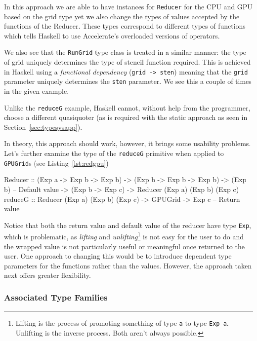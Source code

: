 \documentclass[12pt,a4paper,twoside]{scrbook}
\begin{document}
In this approach we are able to have instances for \texttt{Reducer} for the CPU
and GPU based on the grid type yet we also change the types of values accepted
by the functions of the Reducer. These types correspond to different types of
functions which tells Haskell to use Accelerate's overloaded versions of
operators.

We also see that the \texttt{RunGrid} type class is treated in a similar manner:
the type of grid uniquely determines the type of stencil function required. This
is achieved in Haskell using a \emph{functional dependency} (\texttt{grid ->
  sten}) meaning that the \texttt{grid} parameter uniquely determines the
\texttt{sten} parameter. We see this a couple of times in the given example.

Unlike the \texttt{reduceG} example, Haskell cannot, without help from the
programmer, choose a different quasiquoter (as is required with the static
approach as seen in Section~\ref{sec:typesysapp}).

In theory, this approach should work, however, it brings some usability
problems. Let's further examine the type of the \texttt{reduceG} primitive
when applied to \texttt{GPUGrid}s (see Listing~\ref{lst:redgpu})

\begin{hflisting}[label={lst:redgpu}, caption={The type of the reducer once the
    Accelerate types are applied.}]
Reducer :: (Exp a -> Exp b -> Exp b)
        -> (Exp b -> Exp b -> Exp b)
        -> (Exp b) -- Default value
        -> (Exp b -> Exp c)
        -> Reducer (Exp a) (Exp b) (Exp c)
reduceG :: Reducer (Exp a) (Exp b) (Exp c)
        -> GPUGrid
        -> Exp c -- Return value
\end{hflisting}

Notice that both the return value and default value of the reducer have type
\texttt{Exp}, which is problematic, as \emph{lifting} and
\emph{unlifting}\footnote{Lifting is the process of promoting something of type
  \texttt{a} to type \texttt{Exp a}. Unlifting is the inverse process. Both
  aren't always possible.}  is not easy for the user to do and the wrapped value
is not particularly useful or meaningful once returned to the user. One approach
to changing this would be to introduce dependent type parameters for the
functions rather than the values. However, the approach taken next offers
greater flexibility.

\subsubsection{Associated Type Families}
\label{sec:assoctypefam}
\end{document}
